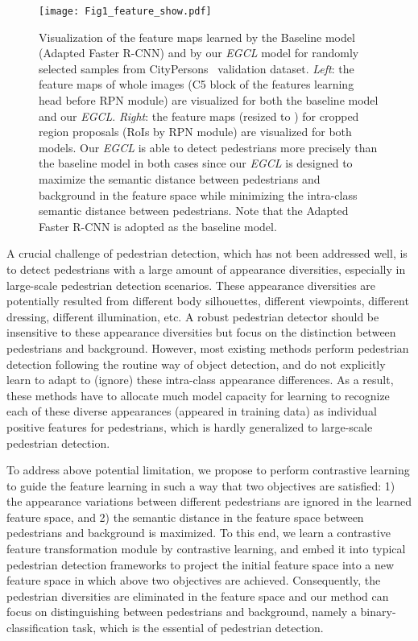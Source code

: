 \documentclass[journal]{IEEEtran}
\begin{document}
\begin{figure*}[t]
\centering
    \texttt{[image: Fig1\_feature\_show.pdf]}
\caption{
    Visualization of the feature maps learned by the Baseline model (Adapted Faster R-CNN) and by our \emph{EGCL} model for randomly selected samples from CityPersons~\cite{zhang2017citypersons} validation dataset. \emph{Left}: the feature maps of whole images (C5 block of the features learning head before RPN module) are visualized for both the baseline model and our \emph{EGCL}. \emph{Right}: the feature maps (resized to ) for cropped region proposals (RoIs by RPN module) are visualized for both models. Our \emph{EGCL} is able to detect pedestrians more precisely than the baseline model in both cases since our \emph{EGCL} is designed to maximize the semantic distance between pedestrians and background in the feature space while minimizing the intra-class semantic distance between pedestrians. Note that the Adapted Faster R-CNN is adopted as the baseline model.
}
\label{Fig:intro}
\end{figure*}




A crucial challenge of pedestrian detection, which has not been addressed well, is to detect pedestrians with a large amount of appearance diversities, especially in large-scale pedestrian detection scenarios. These appearance diversities are potentially resulted from different body silhouettes, different viewpoints, different dressing, different illumination, etc. A robust pedestrian detector should be insensitive to these appearance diversities but focus on the distinction between pedestrians and background. However, most existing methods perform pedestrian detection following the routine way of object detection, and do not explicitly learn to adapt to (ignore) these intra-class appearance differences. As a result, these methods have to allocate much model capacity for learning to recognize each of these diverse appearances (appeared in training data) as individual positive features for pedestrians, which is hardly generalized to large-scale pedestrian detection.

To address above potential limitation, we propose to perform contrastive learning to guide the feature learning in such a way that two objectives are satisfied: 1) the appearance variations between different pedestrians are ignored in the learned feature space, and 2) the semantic distance in the feature space between pedestrians and background is maximized. To this end, we learn a contrastive feature transformation module by contrastive learning, and embed it into typical pedestrian detection frameworks to project the initial feature space into a new feature space in which above two objectives are achieved. Consequently, the pedestrian diversities are eliminated in the feature space and our method can focus on distinguishing between pedestrians and background, namely a binary-classification task, which is the essential of pedestrian detection.
\end{document}
